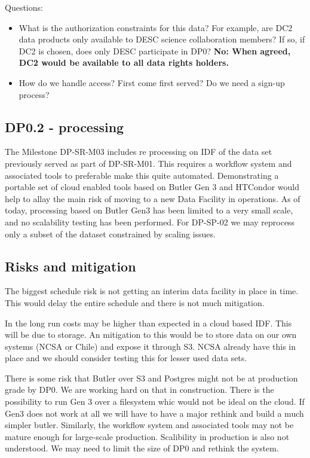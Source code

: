 Questions:

\begin{itemize}

\item What is the authorization constraints for this data? For example, are DC2 data products only available to DESC science collaboration members? If so, if DC2 is chosen, does only DESC participate in DP0?
	{\bf No: When agreed, DC2 would be available to all data rights holders.}

\item How do we handle access? First come first served? Do we need a sign-up process?

\end{itemize}

\subsection{DP0.2 - processing}

The Milestone DP-SR-M03 includes re processing on IDF of the data set previously served as part of DP-SR-M01.
This requires a workflow system and associated tools to preferable make this quite automated.
Demonstrating a portable set of cloud enabled tools based on Butler Gen 3 and HTCondor would help to allay the main risk of moving to a new Data Facility in operations.
As of today, processing based on Butler Gen3 has been limited to a very small scale, and no scalability testing has been performed. For DP-SP-02 we may reprocess only a subset of the dataset constrained by scaling issues.


\subsection{Risks and mitigation}

The biggest schedule risk is not getting an interim data facility in place in time.
This would delay the entire schedule and there is not much mitigation.

In the long run costs may be higher than expected in a cloud based IDF. This will be due to storage.
An mitigation to this would be to store data on our own systems (NCSA or Chile) and expose it through S3.
NCSA already have this in place and we should consider testing this for lesser used data sets.

There is some risk that  Butler over S3 and Postgres  might not be at  production grade by DP0. We are working hard on that in construction. There is the possibility to run Gen 3 over a filesystem whic would not be ideal on the cloud. If Gen3 does not work at all we will have to have a major rethink and build a much simpler butler.
Similarly, the workflow system and associated tools may not be mature enough for large-scale production. Scalibility in production is also not understood. We may need to limit the size of DP0 and rethink the system.
